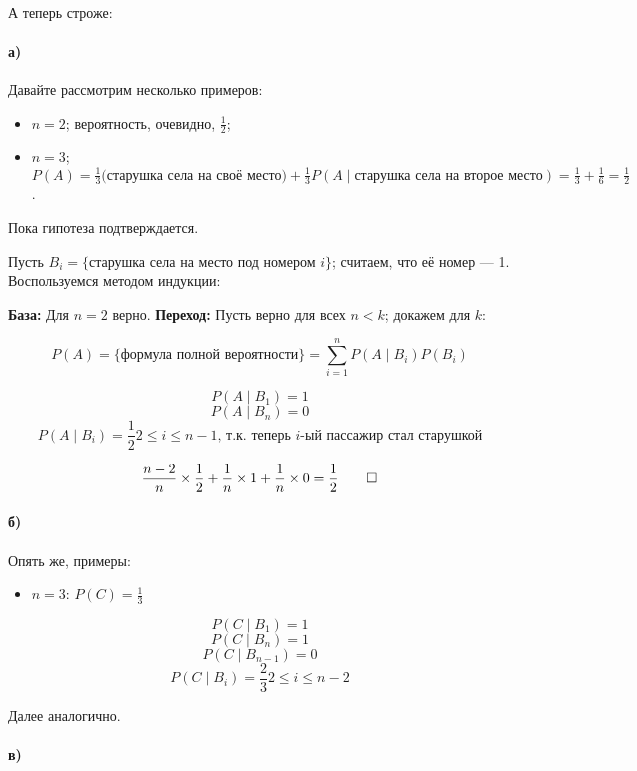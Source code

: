 \paragraph{}А теперь строже:

\paragraph{а)} Давайте рассмотрим несколько примеров:
\begin{itemize}
    \item $n = 2$; вероятность, очевидно, $\frac{1}{2}$;
    \item $n = 3$; $P(A) = \frac{1}{3} \text{(старушка села на своё место)} + \frac{1}{3}P(A\mid \text{старушка села на второе место}) = \frac{1}{3} + \frac{1}{6} = \frac{1}{2}$.
\end{itemize}

    Пока гипотеза подтверждается.

    Пусть $B_i = \{\text{старушка села на место под номером $i$}\}$; считаем, что её номер --- 1. Воспользуемся методом индукции:

    \textbf{База:} Для $n=2$ верно.
    \textbf{Переход:} Пусть верно для всех $n < k$; докажем для $k$:

    \[
    P(A) = \{\text{формула полной вероятности}\} = \sum\limits_{i=1}^n P(A\mid B_i)P(B_i)
    \]

    \[P(A\mid B_1) = 1\]
    \[P(A\mid B_n) = 0\]
    \[P(A\mid B_i) = \frac{1}{2} 2\leqslant i\leqslant n-1 \text{, т.к. теперь $i$-ый пассажир стал старушкой}\]

    \[\frac{n-2}{n}\times\frac{1}{2} + \frac{1}{n}\times 1 + \frac{1}{n}\times 0 = \frac{1}{2} \qed\]

\paragraph{б)}
    Опять же, примеры:
\begin{itemize}
    \item $n=3$: $P(C) = \frac{1}{3}$
\end{itemize}

    \[P(C\mid B_1) = 1\]
    \[P(C\mid B_n) = 1\]
    \[P(C\mid B_{n-1}) = 0\]
    \[P(C\mid B_i) = \frac{2}{3} 2\leqslant i\leqslant n-2\]

    Далее аналогично.

\paragraph{в)}

